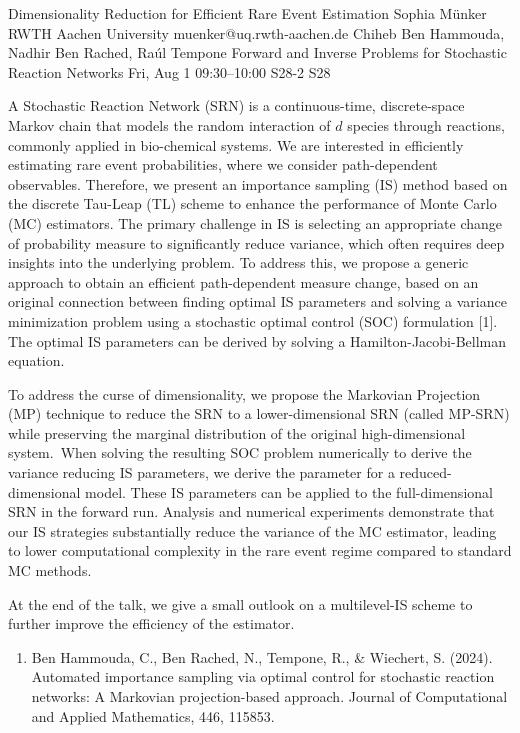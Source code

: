 \documentclass[12pt,lettersize,oneside]{book} %
\begin{document}
\begin{talk}
  {Dimensionality Reduction for Efficient Rare Event Estimation}%
  {Sophia M\"unker}%
  {RWTH Aachen University}%
  {muenker@uq.rwth-aachen.de}%
  {Chiheb Ben Hammouda, Nadhir Ben Rached, Ra\'ul Tempone}%
  {Forward and Inverse Problems for Stochastic Reaction Networks}%
  {Fri, Aug 1 09:30--10:00}%
  {S28-2}%
  {S28}%
    
   
A Stochastic Reaction Network (SRN) is a continuous-time, discrete-space Markov chain that models the random interaction of $d$ species through reactions, commonly applied in bio-chemical systems. We are interested in efficiently estimating rare event probabilities, where we consider path-dependent observables. Therefore, we present an importance sampling (IS) method based on the discrete Tau-Leap (TL) scheme to enhance the performance of Monte Carlo (MC) estimators. The primary challenge in IS is selecting an appropriate change of probability measure to significantly reduce variance, which often requires deep insights into the underlying problem. To address this, we propose a generic approach to obtain an efficient path-dependent measure change, based on an original connection between finding optimal IS parameters and solving a variance minimization problem using a stochastic optimal control (SOC) formulation [1]. The optimal IS parameters can be derived by solving a Hamilton-Jacobi-Bellman equation.

To address the curse of dimensionality, we propose the Markovian Projection (MP) technique to reduce the SRN to a lower-dimensional SRN (called MP-SRN) while preserving the marginal distribution of the original high-dimensional system. When solving the resulting SOC problem numerically to derive the variance reducing IS parameters, we derive the parameter for a reduced-dimensional model. These IS parameters can be applied to the full-dimensional SRN in the forward run. Analysis and numerical experiments demonstrate that our IS strategies substantially reduce the variance of the MC estimator, leading to lower computational complexity in the rare event regime compared to standard MC methods. 

At the end of the talk, we give a small outlook on a multilevel-IS scheme to further improve the efficiency of the estimator.


\begin{enumerate}
   \item[{[1]}] Ben Hammouda, C., Ben Rached, N., Tempone, R., \& Wiechert, S. (2024). Automated importance sampling via optimal control for stochastic reaction networks: A Markovian projection-based approach. Journal of Computational and Applied Mathematics, 446, 115853.
\end{enumerate}

\medskip
\end{talk}
\end{document}
